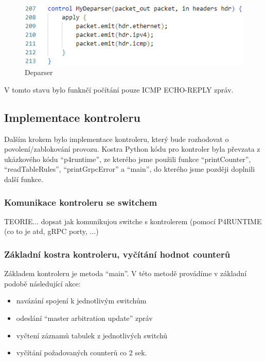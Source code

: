 \documentclass[czech, 11pt]{article}
\begin{document}
     \begin{figure}[H]
		\centering
		\includegraphics[width=.6\textwidth,height=\textheight,keepaspectratio]{Figures/icmp_parsovani/deparser.png}
		\caption{Deparser}
		\label{icmp_header}
	\end{figure}

    V tomto stavu bylo funknčí počítání pouze ICMP ECHO-REPLY zpráv.
    
    \subsection{Implementace kontroleru}
    Dalším krokem bylo implementace kontroleru, který bude rozhodovat o povolení/zablokování provozu. Kostra Python kódu pro kontroler byla převzata z ukázkového kódu \enquote{p4runtime}, ze kterého jsme použili funkce \enquote{printCounter}, \enquote{readTableRules}, \enquote{printGrpcError} a \enquote{main}, do kterého jsme později doplnili další funkce.

    \subsubsection{Komunikace kontroleru se switchem}
    TEORIE... dopsat jak komunikujou switche s kontrolerem (pomocí P4RUNTIME (co to je atd, gRPC porty, ...)
    

    \newpage
    \subsubsection{Základní kostra kontroleru, vyčítání hodnot counterů}
    Základem kontroleru je metoda \enquote{main}. V této metodě provádíme v základní podobě následující akce: 
    \begin{itemize}
        \item navázání spojení k jednotlivým switchům
        \item odeslání \enquote{master arbitration update} zpráv
        \item vyčtení záznamů tabulek z jednotlivých switchů
        \item vyčítání požadovaných counterů co 2 sek.
    \end{itemize}
\end{document}

